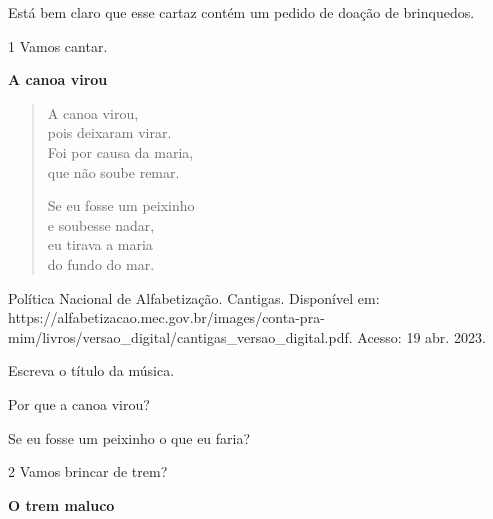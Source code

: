 {{{Está bem claro que esse cartaz contém um pedido de doação de brinquedos.


\num{1} Vamos cantar.


\textbf{A canoa virou}

\begin{verse}
A canoa virou,\\
pois deixaram virar.\\
Foi por causa da maria,\\
que não soube remar.

Se eu fosse um peixinho\\
e soubesse nadar,\\
eu tirava a maria\\
do fundo do mar.
\end{verse}

Política Nacional de Alfabetização. Cantigas. Disponível em: https://alfabetizacao.mec.gov.br/images/conta-pra-mim/livros/versao_digital/cantigas_versao_digital.pdf. Acesso: 19 abr. 2023. 

\begin{escolha}
\item Escreva o título da música.



\item Por que a canoa virou?



\item Se eu fosse um peixinho o que eu faria?


\begin{escolha}

\num{2} Vamos brincar de trem?


\textbf{O trem maluco}


\end{escolha}
\end{escolha}}}}
